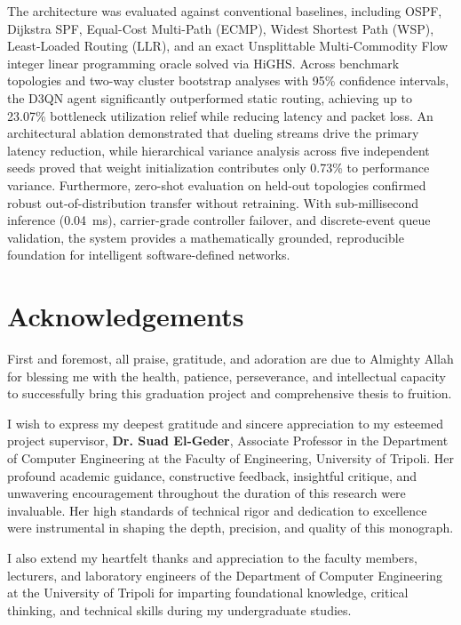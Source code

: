 \documentclass[12pt,a4paper,oneside]{report}
\begin{document}
The architecture was evaluated against conventional baselines, including OSPF, Dijkstra SPF, Equal-Cost Multi-Path (ECMP), Widest Shortest Path (WSP), Least-Loaded Routing (LLR), and an exact Unsplittable Multi-Commodity Flow integer linear programming oracle solved via HiGHS. Across benchmark topologies and two-way cluster bootstrap analyses with 95\% confidence intervals, the D3QN agent significantly outperformed static routing, achieving up to 23.07\% bottleneck utilization relief while reducing latency and packet loss. An architectural ablation demonstrated that dueling streams drive the primary latency reduction, while hierarchical variance analysis across five independent seeds proved that weight initialization contributes only 0.73\% to performance variance. Furthermore, zero-shot evaluation on held-out topologies confirmed robust out-of-distribution transfer without retraining. With sub-millisecond inference (0.04~ms), carrier-grade controller failover, and discrete-event queue validation, the system provides a mathematically grounded, reproducible foundation for intelligent software-defined networks.

\newpage

\chapter*{Acknowledgements}

First and foremost, all praise, gratitude, and adoration are due to Almighty Allah for blessing me with the health, patience, perseverance, and intellectual capacity to successfully bring this graduation project and comprehensive thesis to fruition.

I wish to express my deepest gratitude and sincere appreciation to my esteemed project supervisor, \textbf{Dr. Suad El-Geder}, Associate Professor in the Department of Computer Engineering at the Faculty of Engineering, University of Tripoli. Her profound academic guidance, constructive feedback, insightful critique, and unwavering encouragement throughout the duration of this research were invaluable. Her high standards of technical rigor and dedication to excellence were instrumental in shaping the depth, precision, and quality of this monograph.

I also extend my heartfelt thanks and appreciation to the faculty members, lecturers, and laboratory engineers of the Department of Computer Engineering at the University of Tripoli for imparting foundational knowledge, critical thinking, and technical skills during my undergraduate studies.
\end{document}
